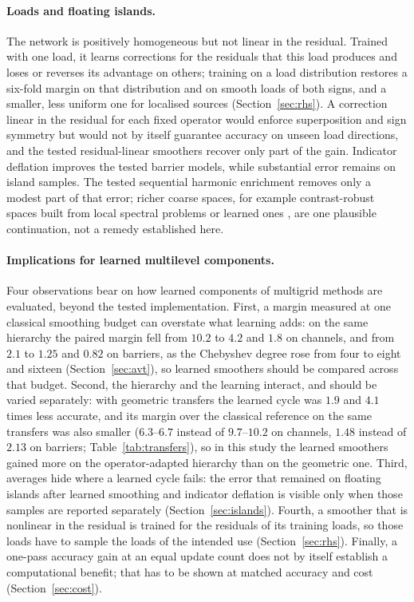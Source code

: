 \paragraph{Loads and floating islands.} The network is positively homogeneous but not linear in the residual. Trained with
one load, it learns corrections for the residuals that this load produces and loses or reverses its advantage on others;
training on a load distribution restores a six-fold margin on that distribution and on smooth loads of both signs, and a
smaller, less uniform one for localised sources (Section~\ref{sec:rhs}). A correction linear in the residual for each fixed
operator would enforce superposition and sign symmetry but would not by itself guarantee accuracy on unseen load directions,
and the tested residual-linear smoothers recover only part of the gain. Indicator deflation improves the tested barrier
models, while substantial error remains on island samples. The tested sequential harmonic enrichment removes only a modest
part of that error; richer coarse spaces, for example contrast-robust spaces built from local spectral problems
\cite{galvis2010,spillane2014geneo,chung2018cem,ma2022} or learned ones \cite{rudikov2025lsino}, are one plausible
continuation, not a remedy established here.

\paragraph{Implications for learned multilevel components.} Four observations bear on how learned components of
multigrid methods are evaluated, beyond the tested implementation. First, a margin measured at one classical smoothing budget
can overstate what learning adds: on the same hierarchy the paired margin fell from $10.2$ to $4.2$ and $1.8$ on channels, and
from $2.1$ to $1.25$ and $0.82$ on barriers, as the Chebyshev degree rose from four to eight and sixteen
(Section~\ref{sec:avt}), so learned smoothers should be compared across that budget. Second, the hierarchy and the learning
interact, and should be varied separately: with geometric transfers the learned cycle was $1.9$ and $4.1$ times less
accurate, and its margin over the classical reference on the same transfers was also smaller ($6.3$--$6.7$ instead of
$9.7$--$10.2$ on channels, $1.48$ instead of $2.13$ on barriers; Table~\ref{tab:transfers}), so in this study the learned
smoothers gained more on the operator-adapted hierarchy than on the geometric one. Third, averages hide where a learned cycle
fails: the error that remained on floating islands after learned smoothing and indicator deflation is visible only when those
samples are reported separately (Section~\ref{sec:islands}). Fourth, a smoother that is nonlinear in the residual is trained
for the residuals of its training loads, so those loads have to sample the loads of the intended use
(Section~\ref{sec:rhs}). Finally, a one-pass accuracy gain at an equal update count does not by itself establish a
computational benefit; that has to be shown at matched accuracy and cost (Section~\ref{sec:cost}).

